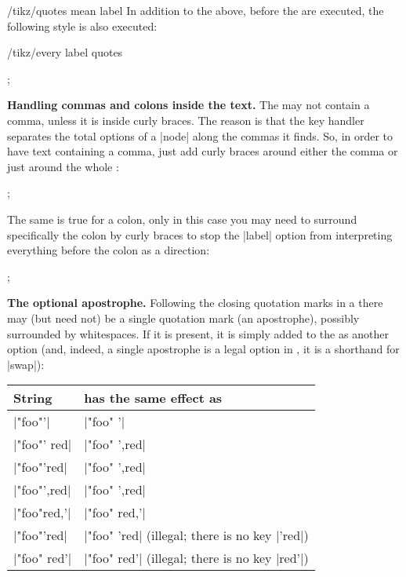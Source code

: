 \begin{key}{/tikz/quotes mean label}
  In addition to the above, before the  are executed,
  the following style is also executed:
  \begin{stylekey}{/tikz/every label quotes}
\begin{codeexample}[]
\tikz [every label quotes/.style=red]
  ;
\end{codeexample}
  \end{stylekey}
  
  \medskip
  \noindent\textbf{Handling commas and colons inside the text.}
  The  may not contain a comma, unless it is inside curly
  braces. The reason is that the key handler separates the total
  options of a |node| along the commas it finds. So, in order to have
  text containing a comma, just add curly braces around either the
  comma or just around the whole :
\begin{codeexample}[]
\tikz {};
\end{codeexample}
  The same is true for a colon, only in this case you may need to
  surround specifically the colon by curly braces to stop the |label|
  option from interpreting everything before the colon as a direction:
\begin{codeexample}[]
\tikz {};
\end{codeexample}

  \medskip
  \noindent\textbf{The optional apostrophe.}
  Following the closing quotation marks in a  there may
  (but need  
  not) be a single quotation mark (an apostrophe), possibly surrounded
  by whitespaces. If it is present, it is simply added to the
   as another option (and, indeed, a single apostrophe
  is a legal option in \tikzname, it is a shorthand for |swap|):

  \begin{tabular}{ll}
    String & has the same effect as \\\hline
    |"foo"'| & |"foo" {'}| \\
    |"foo"' red| & |"foo" {',red}| \\
    |"foo"'{red}| & |"foo" {',red}| \\
    |"foo"{',red}| & |"foo" {',red}| \\
    |"foo"{red,'}| & |"foo" {red,'}| \\
    |"foo"{'red}| & |"foo" {'red}| (illegal; there is no key |'red|)\\
    |"foo" red'| & |"foo" {red'}| (illegal; there is no key |red'|)\\
  \end{tabular}
\end{key}


